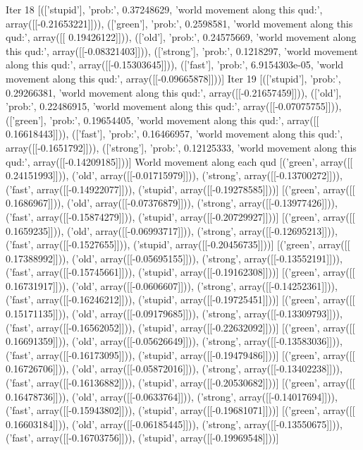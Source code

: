 Iter 18 [(['stupid'], 'prob:', 0.37248629, 'world movement along this qud:', array([[-0.21653221]])), (['green'], 'prob:', 0.2598581, 'world movement along this qud:', array([[ 0.19426122]])), (['old'], 'prob:', 0.24575669, 'world movement along this qud:', array([[-0.08321403]])), (['strong'], 'prob:', 0.1218297, 'world movement along this qud:', array([[-0.15303645]])), (['fast'], 'prob:', 6.9154303e-05, 'world movement along this qud:', array([[-0.09665878]]))]
Iter 19 [(['stupid'], 'prob:', 0.29266381, 'world movement along this qud:', array([[-0.21657459]])), (['old'], 'prob:', 0.22486915, 'world movement along this qud:', array([[-0.07075755]])), (['green'], 'prob:', 0.19654405, 'world movement along this qud:', array([[ 0.16618443]])), (['fast'], 'prob:', 0.16466957, 'world movement along this qud:', array([[-0.1651792]])), (['strong'], 'prob:', 0.12125333, 'world movement along this qud:', array([[-0.14209185]]))]
World movement along each qud
[('green', array([[ 0.24151993]])), ('old', array([[-0.01715979]])), ('strong', array([[-0.13700272]])), ('fast', array([[-0.14922077]])), ('stupid', array([[-0.19278585]]))]
[('green', array([[ 0.1686967]])), ('old', array([[-0.07376879]])), ('strong', array([[-0.13977426]])), ('fast', array([[-0.15874279]])), ('stupid', array([[-0.20729927]]))]
[('green', array([[ 0.1659235]])), ('old', array([[-0.06993717]])), ('strong', array([[-0.12695213]])), ('fast', array([[-0.1527655]])), ('stupid', array([[-0.20456735]]))]
[('green', array([[ 0.17388992]])), ('old', array([[-0.05695155]])), ('strong', array([[-0.13552191]])), ('fast', array([[-0.15745661]])), ('stupid', array([[-0.19162308]]))]
[('green', array([[ 0.16731917]])), ('old', array([[-0.0606607]])), ('strong', array([[-0.14252361]])), ('fast', array([[-0.16246212]])), ('stupid', array([[-0.19725451]]))]
[('green', array([[ 0.15171135]])), ('old', array([[-0.09179685]])), ('strong', array([[-0.13309793]])), ('fast', array([[-0.16562052]])), ('stupid', array([[-0.22632092]]))]
[('green', array([[ 0.16691359]])), ('old', array([[-0.05626649]])), ('strong', array([[-0.13583036]])), ('fast', array([[-0.16173095]])), ('stupid', array([[-0.19479486]]))]
[('green', array([[ 0.16726706]])), ('old', array([[-0.05872016]])), ('strong', array([[-0.13402238]])), ('fast', array([[-0.16136882]])), ('stupid', array([[-0.20530682]]))]
[('green', array([[ 0.16478736]])), ('old', array([[-0.0633764]])), ('strong', array([[-0.14017694]])), ('fast', array([[-0.15943802]])), ('stupid', array([[-0.19681071]]))]
[('green', array([[ 0.16603184]])), ('old', array([[-0.06185445]])), ('strong', array([[-0.13550675]])), ('fast', array([[-0.16703756]])), ('stupid', array([[-0.19969548]]))]
